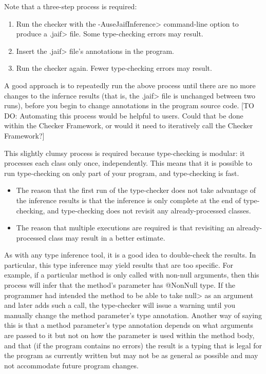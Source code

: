 Note that a three-step process is required:
\begin{enumerate}
\item Run the checker with the \<-AuseJaifInference> command-line option to
  produce a \<.jaif> file.  Some type-checking errors may result.
\item Insert the \<.jaif> file's annotations in the program.
\item Run the checker again.  Fewer type-checking errors may result.
\end{enumerate}
\noindent
A good approach is to repeatedly run the above process until there are no
more changes to the infernce results (that is, the \<.jaif> file is
unchanged between two runs), before you begin to change annotations in the
program source code.
[TO DO: Automating this process would be helpful to users.  Could that be
  done within the Checker Framework, or would it need to iteratively call
  the Checker Framework?]

This slightly clumsy process is required because type-checking is modular:
it processes each class only once, independently.  This means that it is
possible to run type-checking on only part of your program, and
type-checking is fast.
\begin{itemize}
\item
  The reason that the first run of the type-checker does not take advantage
  of the inference results is that the inference is only complete at the
  end of type-checking, and type-checking does not revisit any
  already-processed classes.
\item
  The reason that multiple executions are required is that revisiting an
  already-processed class may result in a better estimate.
\end{itemize}

As with any type inference tool, it is a good idea to double-check the
results.  In particular, this type inference may yield results that are too
specific.  For example, if a particular method is only called with non-null
arguments, then this process will infer that the method's parameter has
@NonNull type.  If the programmer had intended the method to be able to
take \<null> as an argument and later adds such a call, the type-checker
will issue a warning until you manually change the method parameter's type
annotation.  Another way of saying this is that a method parameter's type
annotation depends on what arguments are passed to it but not on how the
parameter is used within the method body, and that (if the program contains
no errors) the result is a typing that is legal for the program as
currently written but may not be as general as possible and may not
accommodate future program changes.


